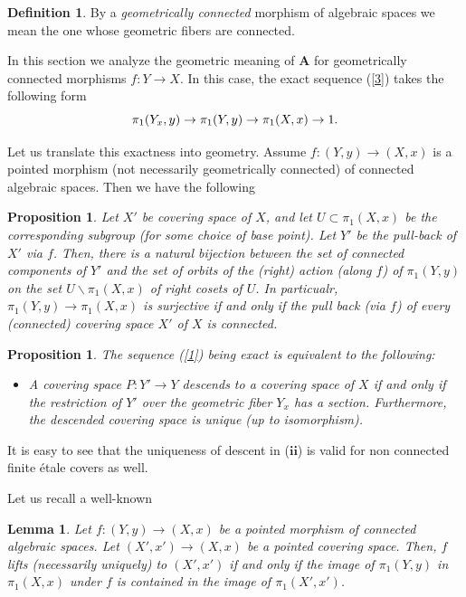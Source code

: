 \documentclass{amsart}
\newtheorem{lem}[thm]{Lemma}
\newtheorem{prop}[thm]{Proposition}
\theoremstyle{definition}
\newtheorem{defn}[thm]{Definition}
\theoremstyle{remark}
\theoremstyle{remark}
\newcommand{\ppXX}{\pi_1(X,x)}
\newcommand{\ppYY}{\pi_1(Y,y)}
\newcommand{\pXX}{\pi_1(X',x')}
\let\:=\colon
\begin{document}
\begin{defn}
By a {\em geometrically connected} morphism of algebraic spaces we
mean the one whose geometric fibers are connected.
\end{defn}

In this section we analyze the geometric meaning of $\mathbf{A}$
for geometrically connected morphisms $f \: Y \to X$. In this
case, the exact sequence (\ref{3}) takes the following form
 \begin{equation}{\label{1}}
\pi_1(Y_x,y) \to \ppYY \to \ppXX \to 1.
\end{equation}

Let us   translate this exactness into geometry.  Assume $f \:
(Y,y) \to (X,x)$ is a pointed morphism (not necessarily
geometrically connected) of connected algebraic spaces.  Then we
have the following

\begin{prop}{\label{P:surj}} Let $X'$ be  covering space of $X$,
and let $U \subset \ppXX$ be the corresponding subgroup (for some
choice of base point). Let $Y'$ be the pull-back of $X'$ via $f$.
Then, there is a natural bijection between the set of connected
components of $Y'$ and the set of orbits of the (right) action
(along $f$) of $\ppYY$ on the set $U\backslash\ppXX$ of right
cosets of $U$. In particualr, $\ppYY \to \ppXX$ is surjective if
and only if the pull back (via $f$) of  every (connected)
 covering space  $X'$ of $X$ is connected.
\end{prop}

\begin{prop}{\label{P:first}}
The sequence (\ref{1}) being exact is equivalent to the following:
\begin{itemize}
\item A covering space $P: Y' \to Y$ descends to a  covering space
of $X$ if and only if the restriction of $Y'$ over the  geometric
fiber $Y_x$ has a section. Furthermore, the descended covering
space is unique (up to isomorphism).
\end{itemize}
\end{prop}

 It is easy to see that the uniqueness
of descent in ($\mathbf{ii}$) is valid for non connected finite
\'{e}tale covers as well.

Let us recall a well-known


\begin{lem}{\label{L:a}}
Let $f \: (Y,y) \to (X,x)$ be a pointed morphism of connected
algebraic spaces. Let $(X',x') \to (X,x)$ be a pointed covering
space. Then, $f$ lifts (necessarily uniquely) to $(X',x')$ if and
only if the image of $\ppYY$ in $\ppXX$ under $f$ is contained in
the image of $\pXX$.
\end{lem}
\end{document}
